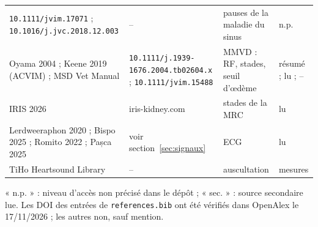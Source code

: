 \documentclass[10pt,a4paper]{article}
\newcommand{\cmd}[1]{\texttt{#1}}
\begin{document}
{\begin{tabularx}{\linewidth}{@{}P{3.9cm}P{3.6cm}LP{1.3cm}@{}}
\nolinkurl{10.1111/jvim.17071} ; \nolinkurl{10.1016/j.jvc.2018.12.003} & -- & pauses de la maladie du sinus & n.p.\\
Oyama 2004 ; Keene 2019 (ACVIM) ; MSD Vet Manual & \nolinkurl{10.1111/j.1939-1676.2004.tb02604.x} ; \nolinkurl{10.1111/jvim.15488} & MMVD : RF, stades, seuil d'œdème & résumé ; lu ; --\\
IRIS 2026 & iris-kidney.com & stades de la MRC & lu\\
Lerdweeraphon 2020 ; Bispo 2025 ; Romito 2022 ; Pașca 2025 & voir section~\ref{sec:signaux} & ECG & lu\\
TiHo Heartsound Library & -- & auscultation & mesures\\
\bottomrule
\end{tabularx}}
« n.p. » : niveau d'accès non précisé dans le dépôt ; « sec. » : source secondaire lue. Les DOI des entrées de \cmd{references.bib} ont été vérifiés dans OpenAlex le 17/11/2026 ; les autres non, sauf mention.
\end{document}
